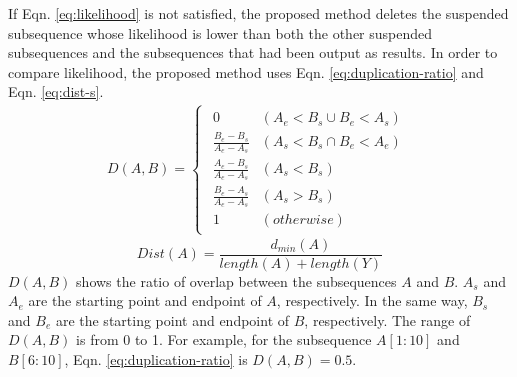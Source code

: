 \documentclass{sigchi-ext}
\begin{document}
        If Eqn. \ref{eq:likelihood} is not satisfied, the proposed method deletes the suspended subsequence whose likelihood is lower than both the other suspended subsequences and the subsequences that had been output as results. In order to compare likelihood, the proposed method uses Eqn. \ref{eq:duplication-ratio} and Eqn. \ref{eq:dist-s}.
        \begin{eqnarray}
            \label{eq:duplication-ratio}
            D(A,B) =
            \begin{cases}
                \begin{array}{ll}
                    0 & ( A_e < B_s \cup B_e < A_s) \\
                    \frac{B_e - B_s}{A_e - A_s} & ( A_s < B_s \cap B_e < A_e) \\
                    \frac{A_e - B_s}{A_e - A_s} & ( A_s < B_s ) \\
                    \frac{B_e - A_s}{A_e - A_s} & ( A_s > B_s ) \\
                    1 & (otherwise)
                \end{array}
            \end{cases}
        \end{eqnarray}
        \begin{equation}
            \label{eq:dist-s}
            Dist(A) = \frac{d_{min}(A)}{length(A) + length(Y)}
        \end{equation}
        $D(A,B)$ shows the ratio of overlap between the subsequences $A$ and $B$. $A_s$ and $A_e$ are the starting point and endpoint of $A$, respectively. In the same way, $B_s$ and $B_e$ are the starting point and endpoint of $B$, respectively. The range of $D(A,B)$ is from 0 to 1. For example, for the subsequence $A[1:10]$ and $B[6:10]$, Eqn. \ref{eq:duplication-ratio} is $D(A,B) = 0.5$.
\end{document}
